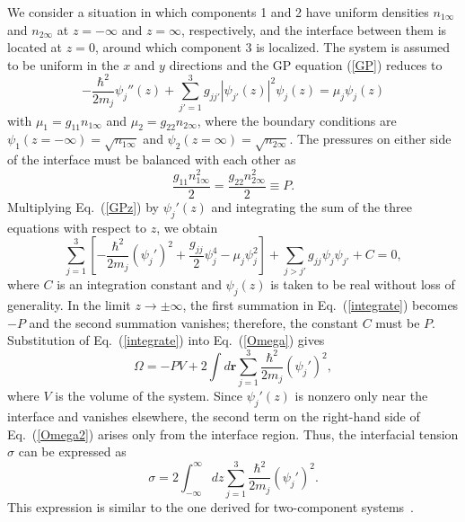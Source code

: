 \documentclass[pra,aps,superscriptaddress,twocolumn,color]{revtex4-1}
\begin{document}
We consider a situation in which components 1 and 2 have uniform densities
$n_{1\infty}$ and $n_{2\infty}$ at $z = -\infty$ and $z = \infty$,
respectively,
and the interface between them is located at $z = 0$, around which component
3 is localized.
The system is assumed to be uniform in the $x$ and $y$ directions and the GP
equation (\ref{GP}) reduces to
\begin{equation} \label{GPz}
-\frac{\hbar^2}{2m_j} \psi_j''(z) + \sum_{j' = 1}^3 g_{jj'}
|\psi_{j'}(z)|^2 \psi_j(z) = \mu_j \psi_j(z)
\end{equation}
with $\mu_1 = g_{11} n_{1\infty}$ and $\mu_2 = g_{22} n_{2\infty}$, where
the boundary conditions are $\psi_1(z = -\infty) = \sqrt{n_{1\infty}}$ and
$\psi_2(z = \infty) = \sqrt{n_{2\infty}}$.
The pressures on either side of the interface must be balanced with each
other as
\begin{equation}
\frac{g_{11} n_{1\infty}^2}{2} = \frac{g_{22} n_{2\infty}^2}{2} \equiv P.
\end{equation}
Multiplying Eq.~(\ref{GPz}) by $\psi_j'(z)$ and integrating the sum of the
three equations with respect to $z$, we obtain
\begin{equation} \label{integrate}
\sum_{j=1}^3 \left[ -\frac{\hbar^2}{2m_j} (\psi_j')^2 + \frac{g_{jj}}{2}
  \psi_j^4 - \mu_j \psi_j^2 \right] + \sum_{j>j'} g_{jj} \psi_j \psi_{j'} +
C = 0,
\end{equation}
where $C$ is an integration constant and $\psi_j(z)$ is taken to be real
without loss of generality.
In the limit $z \rightarrow \pm \infty$, the first summation in
Eq.~(\ref{integrate}) becomes $-P$ and the second summation vanishes;
therefore, the constant $C$ must be $P$.
Substitution of Eq.~(\ref{integrate}) into Eq.~(\ref{Omega}) gives
\begin{equation} \label{Omega2}
\Omega = -PV + 2 \int d\bm{r} \sum_{j=1}^3 \frac{\hbar^2}{2m_j} (\psi_j')^2,
\end{equation}
where $V$ is the volume of the system.
Since $\psi_j'(z)$ is nonzero only near the interface and vanishes elsewhere,
the second term on the right-hand side of Eq.~(\ref{Omega2}) arises only
from the interface region.
Thus, the interfacial tension $\sigma$ can be expressed as
\begin{equation} \label{sigma}
\sigma = 2 \int_{-\infty}^\infty dz \sum_{j=1}^3 \frac{\hbar^2}{2m_j}
(\psi_j')^2.
\end{equation}
This expression is similar to the one derived for two-component
systems~\cite{Schae}.
\end{document}
